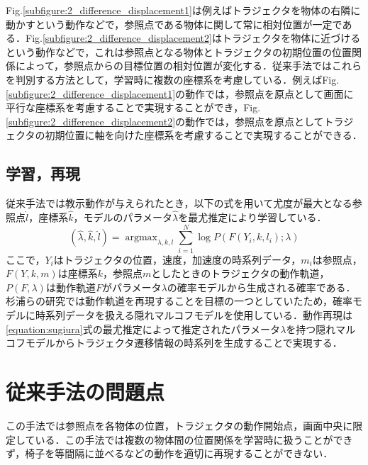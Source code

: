 Fig.\ref{subfigure:2_difference_displacement1}は例えばトラジェクタを物体の右隣に動かすという動作などで，参照点である物体に関して常に相対位置が一定である．Fig.\ref{subfigure:2_difference_displacement2}はトラジェクタを物体に近づけるという動作などで，これは参照点となる物体とトラジェクタの初期位置の位置関係によって，参照点からの目標位置の相対位置が変化する．従来手法ではこれらを判別する方法として，学習時に複数の座標系を考慮している．例えばFig.\ref{subfigure:2_difference_displacement1}の動作では，参照点を原点として画面に平行な座標系を考慮することで実現することができ，Fig.\ref{subfigure:2_difference_displacement2}の動作では，参照点を原点としてトラジェクタの初期位置に軸を向けた座標系を考慮することで実現することができる．

\subsection{学習，再現}

従来手法では教示動作が与えられたとき，以下の式を用いて尤度が最大となる参照点$\hat{l}$，座標系$\hat{k}$，モデルのパラメータ$\hat{λ}$を最尤推定により学習している．
\begin{equation}
	\label{equation:sugiura}
	(\hat{λ} , \hat{k} , \hat{l}) = \mathop{\arg\max}_{λ , k , l}\sum_{i=1}^{N}\log P(F(Y_{i} , k , l_{i}) ; λ)
\end{equation}
ここで，$Y_{i}$はトラジェクタの位置，速度，加速度の時系列データ，$m_{i}$は参照点，$F(Y , k , m)$は座標系$k$，参照点$m$としたときのトラジェクタの動作軌道，$P(F,λ)$は動作軌道$F$がパラメータ$λ$の確率モデルから生成される確率である．杉浦らの研究では動作軌道を再現することを目標の一つとしていたため，確率モデルに時系列データを扱える隠れマルコフモデルを使用している．動作再現は\ref{equation:sugiura}式の最尤推定によって推定されたパラメータ$λ$を持つ隠れマルコフモデルからトラジェクタ遷移情報の時系列を生成することで実現する．

\section{従来手法の問題点}

この手法では参照点を各物体の位置，トラジェクタの動作開始点，画面中央に限定している．この手法では複数の物体間の位置関係を学習時に扱うことができず，椅子を等間隔に並べるなどの動作を適切に再現することができない．